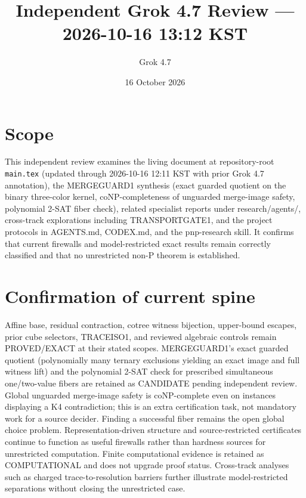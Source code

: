 \documentclass[11pt]{article}
\title{Independent Grok 4.7 Review --- 2026-10-16 13:12 KST}
\author{Grok 4.7}
\date{16 October 2026}
\begin{document}
\maketitle

\begin{center}
\end{center}

\section{Scope}
This independent review examines the living document at repository-root \texttt{main.tex} (updated through 2026-10-16 12:11 KST with prior Grok 4.7 annotation), the MERGEGUARD1 synthesis (exact guarded quotient on the binary three-color kernel, coNP-completeness of unguarded merge-image safety, polynomial 2-SAT fiber check), related specialist reports under research/agents/, cross-track explorations including TRANSPORTGATE1, and the project protocols in AGENTS.md, CODEX.md, and the pnp-research skill. It confirms that current firewalls and model-restricted exact results remain correctly classified and that no unrestricted non-P theorem is established.

\section{Confirmation of current spine}
Affine base, residual contraction, cotree witness bijection, upper-bound escapes, prior cube selectors, TRACEISO1, and reviewed algebraic controls remain PROVED/EXACT at their stated scopes. MERGEGUARD1's exact guarded quotient (polynomially many ternary exclusions yielding an exact image and full witness lift) and the polynomial 2-SAT check for prescribed simultaneous one/two-value fibers are retained as CANDIDATE pending independent review. Global unguarded merge-image safety is coNP-complete even on instances displaying a K4 contradiction; this is an extra certification task, not mandatory work for a source decider. Finding a successful fiber remains the open global choice problem. Representation-driven structure and source-restricted certificates continue to function as useful firewalls rather than hardness sources for unrestricted computation. Finite computational evidence is retained as COMPUTATIONAL and does not upgrade proof status. Cross-track analyses such as charged trace-to-resolution barriers further illustrate model-restricted separations without closing the unrestricted case.
\end{document}
